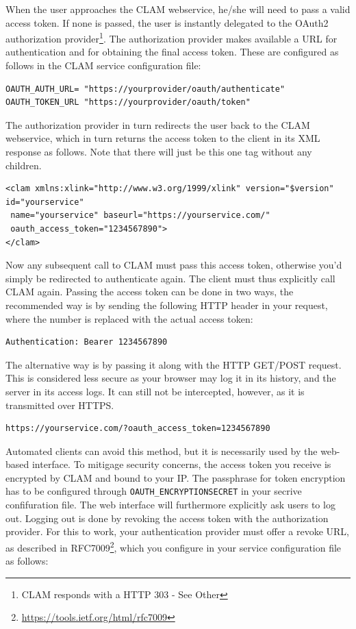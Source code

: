 \documentclass[a4paper,12pt]{report}
\begin{document}
When the user approaches the CLAM webservice, he/she will need to pass a valid
access token. If none is passed, the user is instantly delegated to the OAuth2
authorization provider\footnote{CLAM responds with a HTTP 303 - See Other}.
The authorization provider makes available a URL for authentication and for
obtaining the final access token. These are configured as follows in the CLAM
service configuration file: 

\begin{verbatim}
OAUTH_AUTH_URL= "https://yourprovider/oauth/authenticate"
OAUTH_TOKEN_URL "https://yourprovider/oauth/token"
\end{verbatim}

The authorization provider in turn redirects the user back to the CLAM
webservice, which in turn returns the access token to the client in its XML
response as follows. Note that there will just be this one tag without any
children.

\begin{verbatim}
<clam xmlns:xlink="http://www.w3.org/1999/xlink" version="$version"
id="yourservice"
 name="yourservice" baseurl="https://yourservice.com/"
 oauth_access_token="1234567890">
</clam>
\end{verbatim}

Now any subsequent call to CLAM must pass this access token, otherwise you'd
simply be redirected to authenticate again. The client must thus explicitly call CLAM
again. Passing the access token can be done in two ways, the recommended way is
by sending the following HTTP header in your request, where the number is
replaced with the actual access token:

\begin{verbatim}
Authentication: Bearer 1234567890
\end{verbatim}

The alternative way is by passing it along with the HTTP GET/POST request. This
is considered less secure as your browser may log it in its history, and the
server in its access logs. It can still not be intercepted, however, as it is
transmitted over HTTPS.

\begin{verbatim}
https://yourservice.com/?oauth_access_token=1234567890
\end{verbatim}

Automated clients can avoid this method, but it is necessarily used by the
web-based interface. To mitigage security concerns, the access token you
receive is encrypted by CLAM and bound to your IP. The passphrase for token
encryption has to be configured through \texttt{OAUTH\_ENCRYPTIONSECRET} in
your secrive confifuration file. The web interface will furthermore explicitly
ask users to log out. Logging out is done by revoking the access token with the
authorization provider. For this to work, your authentication provider must
offer a revoke URL, as described in RFC7009\footnote{
\url{https://tools.ietf.org/html/rfc7009}}, which you configure in your service
configuration file as follows:
\end{document}
